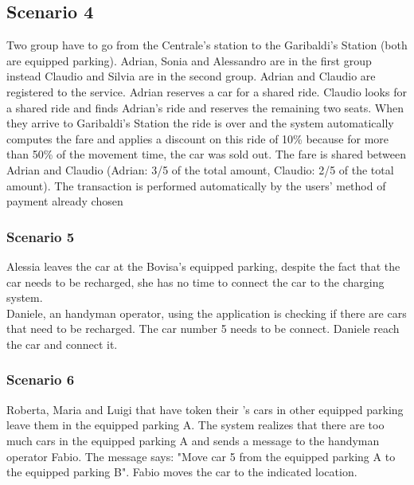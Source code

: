 \subsection{Scenario 4}
Two group have to go from the Centrale's station to the Garibaldi's Station (both are equipped parking).
Adrian, Sonia and Alessandro are in the first group instead Claudio and Silvia are in the second group. Adrian and Claudio are registered to the service. Adrian reserves a car for a shared ride. Claudio looks for a shared ride and finds Adrian's ride and reserves the remaining two seats. When they arrive to Garibaldi's Station the ride is over and the system automatically computes the fare and applies a discount on this ride of 10\% because for more than 50\% of the movement time, the car was sold out.
The fare is shared between Adrian and Claudio (Adrian: 3/5 of the total amount, Claudio: 2/5 of the total amount). The transaction is performed automatically by the users' method of payment already chosen
\subsubsection{Scenario 5}
Alessia leaves the car at the Bovisa's equipped parking, despite the fact that the car needs to be recharged, she has no time to connect the car to the charging system. \\
Daniele, an handyman operator, using the \pej application is checking if there are cars that need to be recharged. The car number 5 needs to be connect. Daniele reach the car and connect it.
\subsubsection{Scenario 6}
Roberta, Maria and Luigi that have token their \pej's cars in other equipped parking leave them in the equipped parking A. The system realizes that there are too much cars in the equipped parking A and sends a message to  the handyman operator Fabio. The message says: "Move car 5 from the equipped parking A to the equipped parking B". Fabio moves the car to the indicated location.